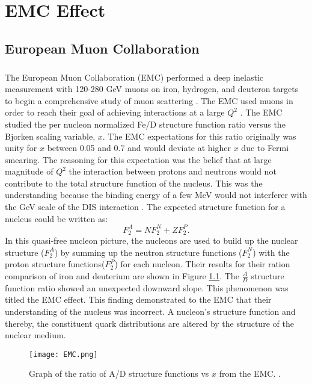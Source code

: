\chapter{EMC Effect}	
\section{European Muon Collaboration}\label{sec:EMC}
\paragraph{}The European Muon Collaboration (EMC) performed a deep inelastic measurement with 120-280 GeV muons on iron, hydrogen, and deuteron targets to begin a comprehensive study of muon scattering \cite{challenge, Norton}. The EMC used muons in order to reach their goal of achieving interactions at a large $Q^2$ \cite{seelyth}. The EMC studied the per nucleon normalized Fe/D structure function ratio versus the Bjorken scaling variable, $x$. The EMC expectations for this ratio originally was unity for $x$ between 0.05 and 0.7 and would deviate at higher $x$ due to Fermi smearing\cite{CC}. The reasoning for this expectation was the belief that at large magnitude of $Q^2$ the interaction between protons and neutrons would not contribute to the total structure function of the nucleus. This was the understanding because the binding energy of a few MeV would not interferer with the GeV scale of the DIS interaction \cite{Ajth}. The expected structure function for a nucleus could be written as:
\begin{equation}
F_2^A = N F_2^N + ZF_2^P.
\end{equation}
In this quasi-free nucleon picture, the nucleons are used to build up the nuclear structure ($F_2^A$) by summing up the neutron structure functions ($F_2^N$) with the proton structure functions($F_2^P$) for each nucleon. Their results for their ration comparison of iron and deuterium are shown in Figure \ref{EMCOld}. The $\frac{A}{D}$ structure function ratio showed an unexpected downward slope. This phenomenon was titled the EMC effect. This finding demonstrated to the EMC that their understanding of the nucleus was incorrect. A nucleon's structure function and thereby, the constituent quark distributions are altered by the structure of the nuclear medium. 
\begin{figure}[h]
	\centering
	\caption{ Graph of the ratio of A/D structure functions vs $x$ from the EMC. \cite{CC,EM}.}
	\label{EMCOld}
	\texttt{[image: EMC.png]} 
\end{figure} 
